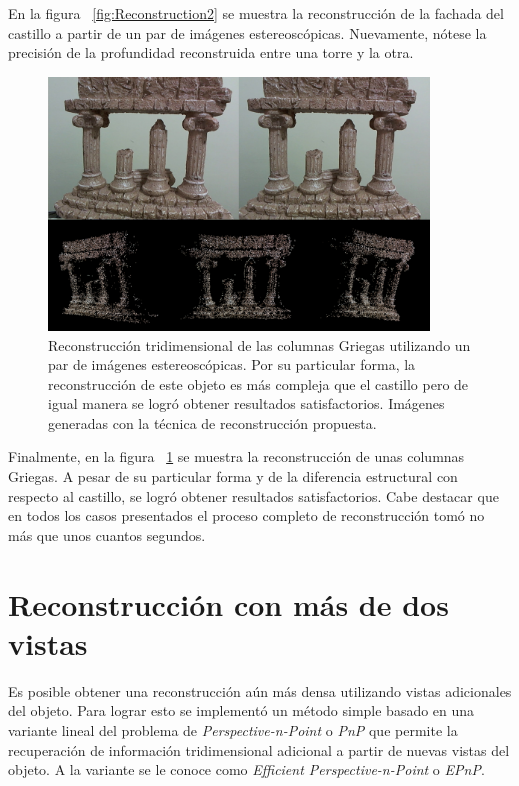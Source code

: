En la figura ~\ref{fig:Reconstruction2} se muestra la reconstrucci\'{o}n de la fachada del castillo a partir de un par de im\'{a}genes estereosc\'{o}picas. Nuevamente, n\'{o}tese la precisi\'{o}n de la profundidad reconstruida entre una torre y la otra.


\begin{figure}[H]
\centering
\includegraphics[width=0.9\textwidth]{images/reconstruction3.png}
\caption[Reconstrucci\'{o}n de las columnas Griegas]%
{Reconstrucci\'{o}n tridimensional de las columnas Griegas utilizando un par de im\'{a}genes estereosc\'{o}picas. Por su particular forma, la reconstrucci\'{o}n de este objeto es m\'{a}s compleja que el castillo pero de igual manera se logr\'{o} obtener resultados satisfactorios. Im\'{a}genes generadas con la t\'{e}cnica de reconstrucción propuesta.}
\label{fig:Reconstruction3}
\end{figure}


Finalmente, en la figura ~\ref{fig:Reconstruction3} se muestra la reconstrucci\'{o}n de unas columnas Griegas. A pesar de su particular forma y de la diferencia estructural con respecto al castillo, se logr\'{o} obtener resultados satisfactorios. Cabe destacar que en todos los casos presentados el proceso completo de reconstrucci\'{o}n tom\'{o} no m\'{a}s que unos cuantos segundos.


\section{Reconstrucci\'{o}n con m\'{a}s de dos vistas}
Es posible obtener una reconstrucci\'{o}n a\'{u}n m\'{a}s densa utilizando vistas adicionales del objeto. Para lograr esto se implement\'{o} un m\'{e}todo simple basado en una variante lineal del problema de \textit{Perspective-n-Point} o \textit{PnP} que permite la recuperaci\'{o}n de informaci\'{o}n tridimensional adicional a partir de nuevas vistas del objeto. A la variante se le conoce como \textit{Efficient Perspective-n-Point} o \textit{EPnP}\cite{F_Moreno_V_Lepetit}.


